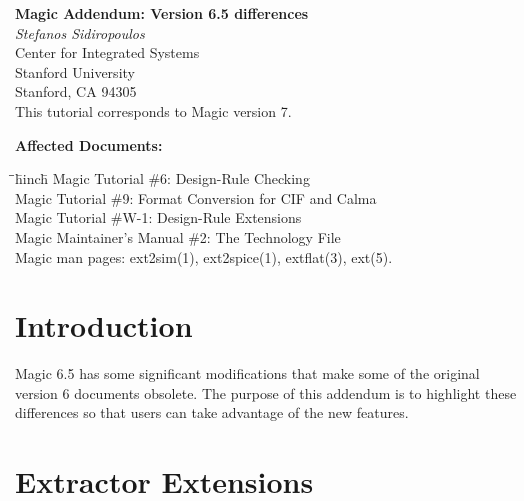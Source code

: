 \documentclass[letterpaper,twoside,12pt]{article}
\def\hinch{\hspace*{0.5in}}
\def\starti{\begin{center}\begin{tabbing}\hinch\=\hinch\=\hinch\=hinch\hinch\=\kill}
\def\endi{\end{tabbing}\end{center}}
\def\mytitle{Magic Addendum: Version 6.5 differences}
\begin{document}
\makeatletter
\newcommand{\ps@magic}{%
	\renewcommand{\@oddhead}{\mytitle\hfil\today}%
	\renewcommand{\@evenhead}{\today\hfil\mytitle}%
	\renewcommand{\@evenfoot}{\hfil\textrm{--{\thepage}--}\hfil}%
	\renewcommand{\@oddfoot}{\@evenfoot}}
\newcommand{\ps@mplain}{%
	\renewcommand{\@oddhead}{}%
	\renewcommand{\@evenhead}{}%
	\renewcommand{\@evenfoot}{\hfil\textrm{--{\thepage}--}\hfil}%
	\renewcommand{\@oddfoot}{\@evenfoot}}
\makeatother
\pagestyle{magic}
\thispagestyle{mplain}

\begin{center}
  {\bfseries \Large \mytitle} \\
  \vspace*{0.5in}
  {\itshape Stefanos Sidiropoulos} \\
  \vspace*{0.5in}
   Center for Integrated Systems \\
   Stanford University \\
   Stanford, CA  94305 \\
  \vspace*{0.25in}
  This tutorial corresponds to Magic version 7. \\
\end{center}
\vspace*{0.5in}

{\noindent\bfseries\large Affected Documents:}
\starti
   \> Magic Tutorial \#6: Design-Rule Checking \\
   \> Magic Tutorial \#9: Format Conversion for CIF and Calma \\
   \> Magic Tutorial \#W-1: Design-Rule Extensions \\
   \> Magic Maintainer's Manual \#2: The Technology File \\
   \> Magic man pages: ext2sim(1), ext2spice(1), extflat(3), ext(5).
\endi

\vspace*{0.25in}
\section{Introduction}

Magic 6.5 has some significant modifications that make some of the
original version 6 documents obsolete.  The purpose of this addendum
is to highlight these differences so that users can take advantage
of the new features. 

\section{Extractor Extensions}
\end{document}
